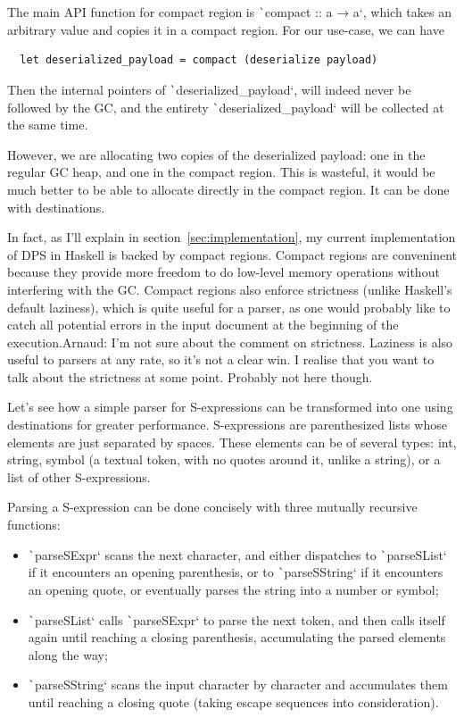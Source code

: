 \documentclass[english]{jflart}
\newcommand{\TODO}[1]{{\color{red}\large #1}}
\begin{document}
The main API function for compact region is \texttt`compact :: a → a`, which takes an arbitrary value and copies it in a compact region. For our use-case, we can have

{\small
\begin{verbatim}
  let deserialized_payload = compact (deserialize payload)
\end{verbatim}
}

Then the internal pointers of \texttt`deserialized_payload`, will indeed never be followed by the GC, and the entirety \texttt`deserialized_payload` will be collected at the same time.

However, we are allocating two copies of the deserialized payload: one in the regular GC heap, and one in the compact region. This is wasteful, it would be much better to be able to allocate directly in the compact region. It can be done with destinations.

In fact, as I'll explain in section~\ref{sec:implementation}, my current implementation of DPS in Haskell is backed by compact regions. Compact regions are conveninent because they provide more freedom to do low-level memory operations without interfering with the GC. Compact regions also enforce strictness (unlike Haskell's default laziness), which is quite useful for a parser, as one would probably like to catch all potential errors in the input document at the beginning of the execution.\TODO{Arnaud: I'm not sure about the comment on strictness. Laziness is also useful to parsers at any rate, so it's not a clear win. I realise that you want to talk about the strictness at some point. Probably not here though.}

Let's see how a simple parser for S-expressions can be transformed into one using destinations for greater performance. S-expressions are parenthesized lists whose elements are just separated by spaces. These elements can be of several types: int, string, symbol (a textual token, with no quotes around it, unlike a string), or a list of other S-expressions.

Parsing a S-expression can be done concisely with three mutually recursive functions:
\begin{itemize}
  \item \texttt`parseSExpr` scans the next character, and either dispatches to \texttt`parseSList` if it encounters an opening parenthesis, or to \texttt`parseSString` if it encounters an opening quote, or eventually parses the string into a number or symbol;
  \item \texttt`parseSList` calls \texttt`parseSExpr` to parse the next token, and then calls itself again until reaching a closing parenthesis, accumulating the parsed elements along the way;
  \item \texttt`parseSString` scans the input character by character and accumulates them until reaching a closing quote (taking escape sequences into consideration).
\end{itemize}
\end{document}
